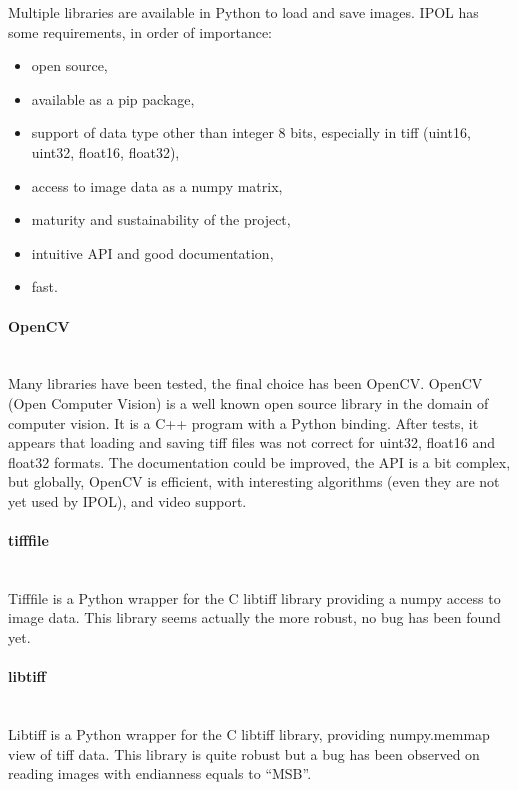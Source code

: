 Multiple libraries are available in Python to load and save images. IPOL has some requirements, in order of importance:

\begin{itemize}
\item open source,
\item available as a pip package,
\item support of data type other than integer 8 bits, especially in tiff (uint16, uint32, float16, float32),
\item access to image data as a numpy matrix,
\item maturity and sustainability of the project,
\item intuitive API and good documentation,
\item fast.
\end{itemize}

\paragraph{OpenCV} \hspace{0pt} \\
Many libraries have been tested, the final choice has been OpenCV. OpenCV (Open Computer Vision) is a well known open source library in the domain of computer vision. It is a C++ program with a Python binding. After tests, it appears that loading and saving tiff files was not correct for uint32, float16 and float32 formats. The documentation could be improved, the API is a bit complex, but globally, OpenCV is efficient, with interesting algorithms (even they are not yet used by IPOL), and video support.

\paragraph{tifffile} \hspace{0pt} \\
Tifffile is a Python wrapper for the C libtiff library providing a numpy access to image data. This library seems actually the more robust, no bug has been found yet.

\paragraph{libtiff} \hspace{0pt} \\
Libtiff is a Python wrapper for the C libtiff library, providing numpy.memmap view of tiff data. This library is quite robust but a bug has been observed on reading images with endianness equals to ``MSB''.

